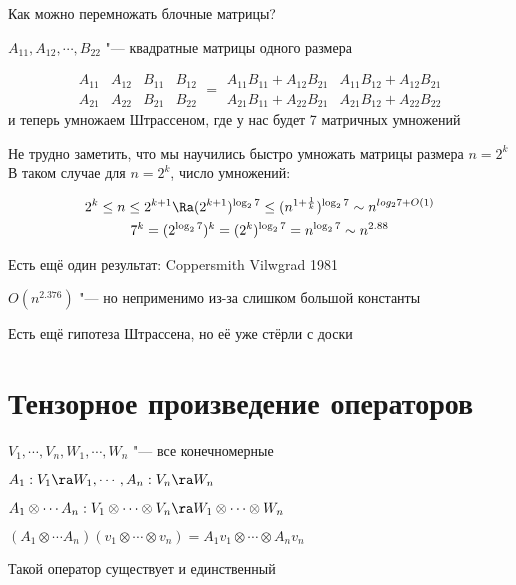Как можно перемножать блочные матрицы?

$A_{11}, A_{12}, \cdots, B_{22}$  "--- квадратные матрицы одного размера

$$\begin{matrix}
        A_{11} & A_{12} \\
        A_{21} & A_{22}
    \end{matrix}
    \begin{matrix}
        B_{11} & B_{12} \\
        B_{21} & B_{22}
    \end{matrix} = 
    \begin{matrix}
        A_{11}B_{11} + A_{12}B_{21} & A_{11}B_{12} + A_{12}B_{21} \\
        A_{21}B_{11} + A_{22}B_{21} & A_{21}B_{12} + A_{22}B_{22}
    \end{matrix}$$
и теперь умножаем Штрассеном, где у нас будет 7 матричных умножений

Не трудно заметить, что мы научились быстро умножать матрицы размера $n = 2^k$
В таком случае для $n = 2^k$, число умножений:

    \begin{gather*}
        2^k \leq n \leq 2^{k+1} \Ra (2^{k+1})^{\log_2 7} \leq (n^{1 + \frac{1}{k}})^{\log_2 7} \sim n^{log_2 7 + O(1)} \\
        7^k = (2^{\log_2 7})^k = (2^k)^{\log_2 7} = n^{\log_2 7} \sim n^{2.88}
    \end{gather*}

Есть ещё один результат: Coppersmith Vilwgrad 1981

$O(n^{2.376})$ "--- но неприменимо из-за слишком большой константы

Есть ещё гипотеза Штрассена, но её уже стёрли с доски

\section{Тензорное произведение операторов}

$V_1, \cdots, V_n, W_1, \cdots, W_n$ "--- все конечномерные

$A_1: V_1 \ra W_1, \cdots, A_n: V_n \ra W_n$

$A_1 \otimes \cdots A_n: V_1 \otimes \cdots \otimes V_n \ra W_1 \otimes \cdots \otimes W_n$

$(A_1 \otimes \cdots A_n)(v_1 \otimes \cdots \otimes v_n) = A_1 v_1 \otimes \cdots \otimes A_n v_n$

\begin{theorem}
    Такой оператор существует и единственный
\end{theorem}

